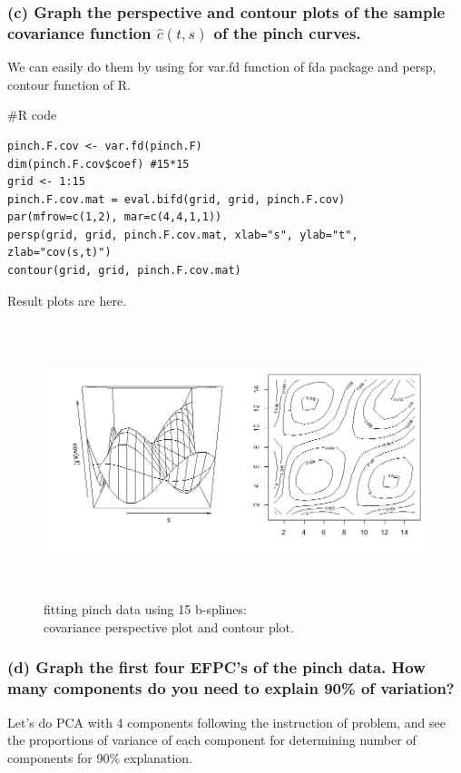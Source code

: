 \documentclass{article}
\newenvironment{Rcode}%
{%
    \begin{mdframed}
    \#R code
    \begin{small}
}
{%
    \end{small}
    \end{mdframed}
}
\begin{document}
\newpage
\subsubsection*{(c) Graph the perspective and contour plots of the sample covariance function $\hat{c}(t,s)$ of the pinch curves.}

We can easily do them by using for var.fd function of fda package and persp, contour function of R.
\begin{Rcode}
    \begin{verbatim}
pinch.F.cov <- var.fd(pinch.F)
dim(pinch.F.cov$coef) #15*15
grid <- 1:15
pinch.F.cov.mat = eval.bifd(grid, grid, pinch.F.cov)
par(mfrow=c(1,2), mar=c(4,4,1,1))
persp(grid, grid, pinch.F.cov.mat, xlab="s", ylab="t", zlab="cov(s,t)")
contour(grid, grid, pinch.F.cov.mat)
    \end{verbatim}
\end{Rcode}

Result plots are here.

\begin{figure}[hh]
    \centering
    \includegraphics[height=8cm]{pinch_F_cov_persp_contour_plot.png}
    \caption{fitting pinch data using 15 b-splines: \\ covariance perspective plot and contour plot.}
\end{figure}

\newpage
\subsubsection*{(d) Graph the first four EFPC’s of the pinch data. How many components do you need to explain 90\% of variation?}

Let's do PCA with 4 components following the instruction of problem, and see the proportions of variance of each component for determining number of components for 90\% explanation.
\end{document}
